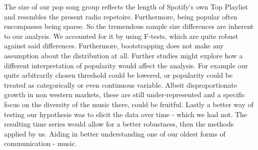 \documentclass{article}
\begin{document}
The size of our pop song group reflects the length of Spotify's own Top Playlist and resembles the present radio repetoire. Furthermore, being popular often encompasses being sparse. So the tremendous sample size differences are inherent to our analysis. We accounted for it by using F-tests, which are quite robust against said differences. Furthermore, bootstrapping does not make any assumption about the distribution at all. 
Further studies might explore how a different interpretation of popularity would affect the analysis. For example our quite arbitrarily chosen threshold could be lowered, or popularity could be treated as categorically or even continuous variable. Albeit disproportionate growth in non western markets, these are still under-represented and a specific focus on the diversity of the music there, could be fruitful. Lastly a better way of testing our hypothesis was to elicit the data over time - which we had not. The resulting time series would allow for a better robustness, then the methods applied by us. Aiding in better understanding one of our oldest forms of communication - music.   




\end{document}
